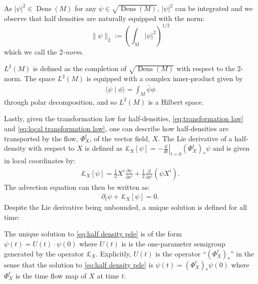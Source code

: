 \documentclass[final,leqno]{siamltex1213}
\newcommand{\pder}[2]{\ensuremath{\frac{ \partial #1}{\partial #2}}}
\DeclareMathOperator{\Dens}{Dens}
\begin{document}
As $|\psi|^{2} \in \Dens(M)$ for any $\psi \in \sqrt{\Dens(M)}$, $|\psi|^{2}$ can be integrated and we observe that half densities are naturally equipped with the norm: $$\| \psi \|_2 :=  \left( \int_M |\psi|^2 \right)^{1/2}$$ which we call the \emph{$2$-norm}.
\begin{definition}
	$L^{2}(M)$ is defined as the completion of $\sqrt{ \Dens(M)}$ with respect to the $2$-norm.
	The space $L^{2}(M)$ is equipped with a complex inner-product given by
	\begin{align}
		\langle \psi \mid \phi \rangle = \int_{M} \bar \psi \phi
	\end{align}
	through polar decomposition, and so $L^{2}(M)$ is a Hilbert space.
\end{definition}

Lastly, given the transformation law for half-densities, \eqref{eq:transformation law} and \eqref{eq:local transformation law}, one can describe how half-densities are transported by the flow, $\Phi_{X}^{t}$, of the vector field, $X$. 
The Lie derivative of a half-density with respect to $X$ is defined as $\pounds_{X}[\psi] = - \left. \frac{d}{dt} \right|_{t=0} (\Phi_{X}^{t})_{*} \psi$ and is given in local coordinates by:
\begin{align}
	\pounds_{X}[\psi] = \frac{1}{2} X^{i} \pder{\psi}{x^{i}} + \frac{1}{2} \pder{}{x^{i}} \left( \psi X^{i} \right). \label{eq:representation}
\end{align}
The advection equation can then be written as:
\begin{align}
	\partial_{t} \psi + \pounds_{X}[\psi] = 0. \label{eq:half density pde}
\end{align}
Despite the Lie derivative being unbounded, a unique solution is defined for all time:
\begin{proposition} \label{prop:stone}
	The unique solution to \eqref{eq:half density pde} is of the form $\psi(t) = U(t) \cdot \psi(0)$ where $U(t)$ is
	is the one-parameter semigroup generated by the operator $\pounds_{X}$.
	Explicitly, $U(t)$ is the operator ``$(\Phi_{X}^{t})_{*}$'' in the sense that the solution to \eqref{eq:half density pde}
	is $\psi(t) = (\Phi_{X}^{t})_{*} \psi(0)$ where $\Phi_{X}^{t}$ is the time flow map of $X$ at time $t$.
\end{proposition}
\end{document}
